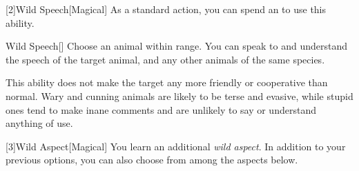         [2]{Wild Speech}[Magical] As a standard action, you can spend an  to use this ability.
        \begin{ability}{Wild Speech}[]
            Choose an animal within \rnglong range.
            You can speak to and understand the speech of the target animal, and any other animals of the same species.

            This ability does not make the target any more friendly or cooperative than normal.
            Wary and cunning animals are likely to be terse and evasive, while stupid ones tend to make inane comments and are unlikely to say or understand anything of use.
        \end{ability}

        [3]{Wild Aspect}[Magical]
        You learn an additional \textit{wild aspect}.
        In addition to your previous options, you can also choose from among the aspects below.
